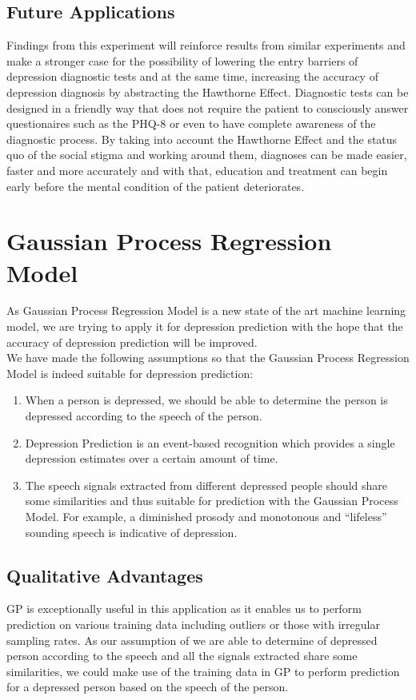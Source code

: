 \documentclass{article}
\begin{document}
	\subsection{Future Applications}
	Findings from this experiment will reinforce results from similar experiments and make a stronger case for the possibility of lowering the entry barriers of depression diagnostic tests and at the same time, increasing the accuracy of depression diagnosis by abstracting the Hawthorne Effect. Diagnostic tests can be designed in a friendly way that does not require the patient to consciously answer questionaires such as the PHQ-8 or even to have complete awareness of the diagnostic process. By taking into account the Hawthorne Effect and the status quo of the social stigma and working around them, diagnoses can be made easier, faster and more accurately and with that, education and treatment can begin early before the mental condition of the patient deteriorates. \\
	
	\section{Gaussian Process Regression Model}
	As Gaussian Process Regression Model is a new state of the art machine learning model, we are trying to apply it for depression prediction 
	with the hope that the accuracy of depression prediction will be improved. \\	
	
	We have made the following assumptions so that the Gaussian Process Regression Model is indeed suitable for depression prediction:
	\begin{enumerate}
		\item When a person is depressed, we should be able to determine the person is depressed according to the speech of the person.\cite{Cummins2015}
		\item Depression Prediction is an event-based recognition which provides a single depression estimates over a certain amount of time. \cite{Valstar2016}
		\item The speech signals extracted from different depressed people should share some similarities and thus suitable for prediction with the Gaussian Process Model. 
		For example, a diminished prosody and monotonous and “lifeless” sounding speech is indicative of depression.\cite{Cummins2015}
	\end{enumerate}

	\subsection{Qualitative Advantages}
	GP is exceptionally useful in this application as it enables us to perform prediction on various training data including outliers or 
	those with irregular sampling rates. As our assumption of we are able to determine of depressed person according to the speech and all 
	the signals extracted share some similarities, we could make use of the training data in GP to perform prediction for a depressed person based on the speech of the person.\\
\end{document}
